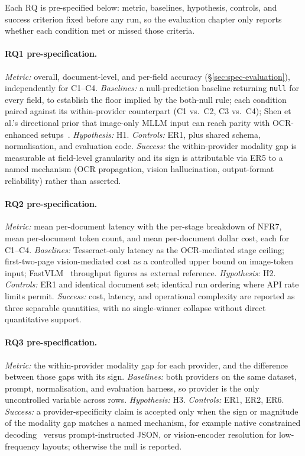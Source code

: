 Each RQ is pre-specified below: metric, baselines, hypothesis,
controls, and success criterion fixed before any run, so the
evaluation chapter only reports whether each condition met or
missed those criteria.

\paragraph{RQ1 pre-specification.} \textit{Metric:} overall,
document-level, and per-field accuracy
(\S\ref{sec:spec-evaluation}), independently for C1--C4.
\textit{Baselines:} a null-prediction baseline returning
\texttt{null} for every field, to establish the floor implied by
the both-null rule; each condition paired against its within-provider
counterpart (C1 vs.~C2, C3 vs.~C4); Shen et al.'s directional prior
that image-only MLLM input can reach parity with OCR-enhanced
setups~\cite{shen2026ocrornot}. \textit{Hypothesis:} H1.
\textit{Controls:} ER1, plus shared schema, normalisation, and
evaluation code. \textit{Success:} the within-provider modality gap
is measurable at field-level granularity and its sign is
attributable via ER5 to a named mechanism (OCR propagation, vision
hallucination, output-format reliability) rather than asserted.

\paragraph{RQ2 pre-specification.} \textit{Metric:} mean per-document
latency with the per-stage breakdown of NFR7, mean per-document
token count, and mean per-document dollar cost, each for C1--C4.
\textit{Baselines:} Tesseract-only latency as the OCR-mediated stage
ceiling; first-two-page vision-mediated cost as a controlled upper
bound on image-token input;
FastVLM~\cite{vasu2024fastvlm} throughput figures as external
reference. \textit{Hypothesis:} H2. \textit{Controls:} ER1 and
identical document set; identical run ordering where API rate limits
permit. \textit{Success:} cost, latency, and operational complexity
are reported as three separable quantities, with no single-winner
collapse without direct quantitative support.

\paragraph{RQ3 pre-specification.} \textit{Metric:} the
within-provider modality gap for each provider, and the difference
between those gaps with its sign. \textit{Baselines:} both providers
on the same dataset, prompt, normalisation, and evaluation harness,
so provider is the only uncontrolled variable across rows.
\textit{Hypothesis:} H3. \textit{Controls:} ER1, ER2, ER6.
\textit{Success:} a provider-specificity claim is accepted only
when the sign or magnitude of the modality gap matches a named
mechanism, for example native constrained
decoding~\cite{openai2024structured} versus prompt-instructed JSON,
or vision-encoder resolution for low-frequency layouts; otherwise
the null is reported.

